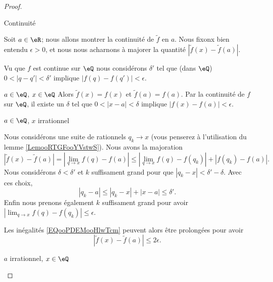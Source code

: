 \begin{proof}
\begin{subproof}
    \item[Continuité]

        Soit \( a\in \eR\); nous allons montrer la continuité de \( \tilde f\) en \( a\). Nous fixonx bien entendu \( \epsilon>0\), et nous nous acharnons à majorer la quantité \( | \tilde f(x)-\tilde f(a) |\).

        Vu que \( f\) est continue sur \( \eQ\) nous considérons \( \delta'\) tel que (dans \( \eQ\)) \( 0<| q-q' |<\delta'\) implique \( | f(q)-f(q') |<\epsilon\).

        \begin{subproof}
            \item[\( a\in \eQ\), \( x\in \eQ\)]
                Alors \( \tilde f(x)=f(x)\) et \( \tilde f(a)=f(a)\). Par la continuité de \( f\) sur \( \eQ\), il existe un \( \delta\) tel que \( 0<| x-a |<\delta\) implique \( | f(x)-f(a) |<\epsilon\).

            \item[\( a\in \eQ\), \( x\) irrationnel]

                Nous considérons une suite de rationnels \( q_k\to x\) (vous penserez à l'utilisation du lemme \ref{LemooRTGFooYVstwS}). Nous avons la majoration
                \begin{equation}        \label{EQooPDEMooHlwTcm}
                    | \tilde f(x)-\tilde f(a) |=| \lim_{q\to x} f(q)-f(a) |\leq | \lim_{q\to x} f(q)-f(q_k) |+| f(q_k)-f(a) |.
                \end{equation}
                Nous considérons \( \delta<\delta'\) et \( k\) suffisament grand pour que \( | q_k-x |<\delta'-\delta\). Avec ces choix,
                \begin{equation}
                    | q_k-a |\leq | q_k-x |+| x-a |\leq \delta'.
                \end{equation}
                Enfin nous prenons également \( k\) suffisament grand pour avoir \( | \lim_{q\to x} f(q)-f(q_k) |\leq \epsilon\).

                Les inégalités \eqref{EQooPDEMooHlwTcm} peuvent alors être prolongées pour avoir
                \begin{equation}
                    | \tilde f(x)-\tilde f(a) |\leq 2\epsilon.
                \end{equation}
                
            \item[\( a\) irrationnel, \( x\in \eQ\)]


\end{subproof}
\end{subproof}
\end{proof}
